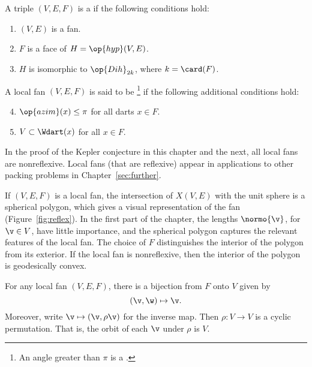\begin{definition} \label{def:convex-local}
A triple $(V,E,F)$ is a  if the following conditions hold:
\begin{enumerate} 
\item {} $(V,E)$ is a fan.
\item {} $F$ is a face of $H = \op{hyp}(V,E)$.
\item {} $H$ is isomorphic to $\op{Dih}_{2k}$, where $k =
\card(F)$.
\end{enumerate}
A local fan $(V,E,F)$ is said to be \footnote{An angle
greater than $\pi$ is a .} if the following
additional conditions hold:
\begin{enumerate}
\setcounter{enumi}{3}
\item %
 $\op{azim}(x)\le \pi$ for all darts $x\in F$.
\item {} $V\subset \Wdart(x)$ for all $x\in F$.
\end{enumerate}
\end{definition}
%

In the proof of the Kepler conjecture in this chapter and the next,
all local fans are nonreflexive.  Local fans (that are reflexive) appear in
applications to other packing problems in Chapter~\ref{sec:further}.

\begin{remark}[visualization]\label{rem:visual}
  If $(V,E,F)$ is a local fan,
  the intersection of $X(V,E)$ with the unit sphere is a spherical
  polygon, which gives a visual representation of the fan (Figure~\ref{fig:reflex}).
  In the first part of the chapter, the lengths $\normo{\v}$, for $\v\in V$,
  have little importance, and the spherical polygon captures the relevant
  features of the local fan.
  The choice of $F$ distinguishes the interior of the polygon from its
  exterior.  If the local fan is nonreflexive, then the interior of the
  polygon is geodesically convex.
\end{remark}

\figFWYNFVS %


\begin{lemma}[]%
For any local fan $(V,E,F)$, there is a bijection from $F$ onto $V$
given by
\[ 
(\v,\w) \mapsto \v.
\] 
Moreover, write $\v\mapsto(\v,\rho\v)$ for the inverse map. 
Then $\rho:V\to V$ is a cyclic permutation.  That is, the orbit
of each $\v$ under $\rho$ is $V$.
\end{lemma}
%

